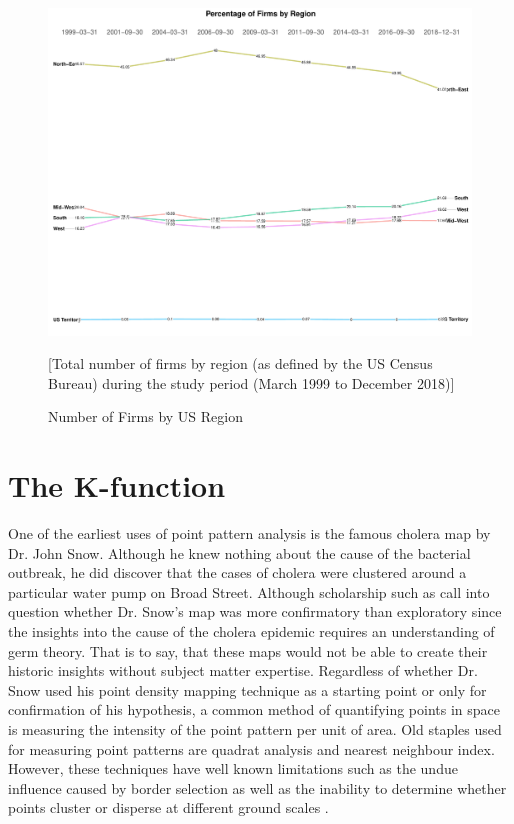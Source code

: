 \begin{figure}
\includegraphics[width=1\linewidth]{Figures/ChapterIII/Percentage_firms_Region_USA}
\caption{Number of Firms by US Region}[Total number of firms by region  (as defined by the US Census Bureau) during the study period (March 1999 to December 2018)]
	\label{fig:Percentage_firms_Region_USA}
\end{figure}



\section{The K-function} 
\label{kfunction}
One of the earliest uses of point pattern analysis is the famous cholera map by Dr. John Snow.  Although he knew nothing about the cause of the bacterial outbreak, he did discover that the cases of cholera were clustered around a particular water pump on Broad Street.  Although scholarship such as \cite{brody2000map} call into question whether Dr. Snow's map was more confirmatory than exploratory since the insights into the cause of the cholera epidemic requires an understanding of germ theory.  That is to say, that these maps would not be able to create their historic insights without subject matter expertise.  Regardless of whether Dr. Snow used his point density mapping technique as a starting point or only for confirmation of his hypothesis,  a common method of quantifying points in space is measuring the intensity of the point pattern per unit of area.  Old staples used for measuring point patterns are quadrat analysis and nearest neighbour index.  However, these techniques have well known limitations such as the undue influence caused by border selection as well as the inability to determine whether points cluster or disperse at different ground scales \citep{spatstatBook}.

